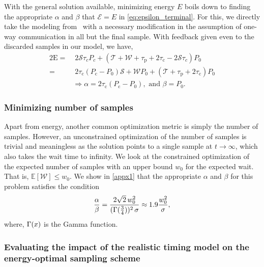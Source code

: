With the general solution available, minimizing energy $E$ boils down to finding the appropriate $\alpha$ and $\beta$ that $\mathcal{E}=E$ in \cref{eq:epsilon_terminal}.
For this, we directly take the modeling from~\cite{secAperiodic} with a necessary modification in the assumption of one-way communication in all but the final sample.
With feedback given even to the discarded samples in our model, we have, 
\begin{alignat}{2}
    \mathrm{E}=&\;2\mathcal{S}\tau_cP_c+(\mathcal{T}+\mathcal{W}+\tau_\mathrm{p}+2\tau_\mathrm{c}-2\mathcal{S}\tau_c)P_0\nonumber\\
    =&\;2\tau_{\text{c}}(P_{\text{c}} -P_0)\mathcal{S}+\mathcal{W}P_0+(\mathcal{T}+\tau_{\text{p}} +2\tau_{\text{c}}) P_0\nonumber\\
&\Rightarrow \alpha=2\tau_{\text{c}}(P_{\text{c}} -P_0),\text{ and }\beta=P_0.\nonumber
\end{alignat}


\subsubsection{Minimizing number of samples }\label{sec:aprxSol_Energy_samples}

Apart from energy, another common optimization metric is simply the number of samples.
However, an unconstrained optimization of the number of samples is trivial and meaningless as the solution points to a single sample at $t\!\rightarrow\!\infty$, which also takes the wait time to infinity.
We look at the constrained optimization of the expected number of samples with an upper bound $w_0$ for the expected wait.
That is, $\mathbb{E}[\mathcal{W}]\!\leq\!w_0$. We show in \cref{appx1} that the appropriate $\alpha$ and $\beta$ for this problem satisfies the condition
\begin{alignat}{1}
\frac{\alpha}{\beta}=\frac{2\sqrt{2}\,w_0^2}{(\mathlarger{\Gamma}(\tfrac{3}{4}))^2\,\sigma}\approx1.9\frac{w_0^2}{\sigma},\nonumber
\end{alignat}
where, $\mathlarger{\Gamma}(x)$ is the Gamma function.


\subsubsection{Evaluating the impact of the realistic timing model on the energy-optimal sampling scheme}

